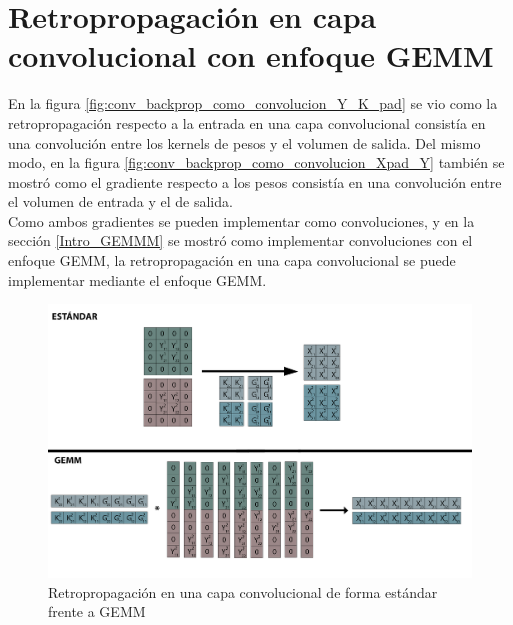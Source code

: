 \section{Retropropagación en capa convolucional con enfoque GEMM}

En la figura \ref{fig:conv_backprop_como_convolucion_Y_K_pad} se vio como la retropropagación respecto a la entrada en una capa convolucional consistía en una convolución entre los kernels de pesos y el volumen de salida. Del mismo modo, en la figura \ref{fig:conv_backprop_como_convolucion_Xpad_Y} también se mostró como el gradiente respecto a los pesos consistía en una convolución entre el volumen de entrada y el de salida. \\
Como ambos gradientes se pueden implementar como convoluciones, y en la sección \ref{Intro_GEMMM} se mostró como implementar convoluciones con el enfoque GEMM, la retropropagación en una capa convolucional se puede implementar mediante el enfoque GEMM.

\begin{figure}[H]
	\hspace{-25mm}
	\includegraphics[scale=0.3]{imagenes/conv_std_vs_gemm_backprop.jpg}  
	\caption{Retropropagación en una capa convolucional de forma estándar frente a GEMM}
	\label{fig:conv_std_vs_gemm_backprop}
\end{figure}
